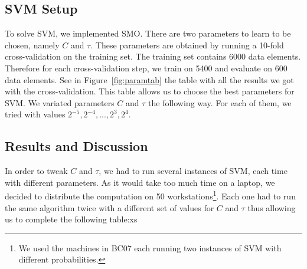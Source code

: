 \documentclass[10pt,a4paper,english]{article}
\begin{document}
\subsection*{SVM Setup}

To solve SVM, we implemented SMO. There are two parameters to learn to be chosen, namely $C$ and $\tau$. These parameters are obtained by running a
10-fold cross-validation on the training set. The training set contains 6000 data elements. Therefore for each cross-validation step, we train on 5400
and evaluate on 600 data elements. See in Figure~\ref{fig:paramtab} the table with all the results we got with the cross-validation. 
This table allows us to choose the best parameters for SVM. We variated parameters $C$ and $\tau$ the following way. For each of them, we tried with values
$2^{-5} , 2^{-4} , ... , 2^{3},2^{4}$.

\subsection*{Results and Discussion}
In order to tweak $ C $ and $ \tau $, we had to run several instances of SVM, each time with different parameters.
As it would take too much time on a laptop, we decided to distribute the computation on 50 workstations\footnote{We used the machines in BC07 each running two instances of SVM with different probabilities.}. Each one had to run the same algorithm twice with a different set of values for $ C $ and $ \tau $ thus allowing us to complete the following table:xs
\end{document}
